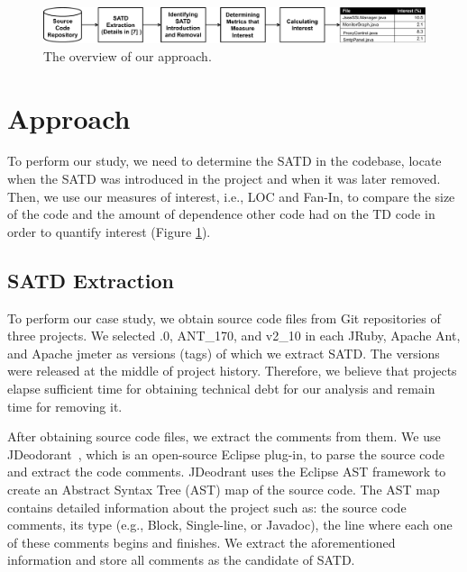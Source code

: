 
\begin{figure}[!t]
  \begin{center}
  \includegraphics[width=.95\textwidth]{figures/overview}
  \caption{The overview of our approach.}
  \label{fig:overview}
  \end{center}
\end{figure}


\section{Approach} \label{sec:approach}
To perform our study, we need to determine the SATD in the codebase, locate when the SATD was introduced in the project and when it was later removed. Then, we use our measures of interest, i.e., LOC and Fan-In, to compare the size of the code and the amount of dependence other code had on the TD code in order to quantify interest (Figure \ref{fig:overview}).

\subsection{SATD Extraction}
To perform our case study, we obtain source code files from Git repositories of three projects. We selected {.0}, {\sc ANT\_170}, and {\sc v2\_10} in each JRuby, Apache Ant, and Apache jmeter as versions (tags) of which we extract SATD. The versions were released at the middle of project history. Therefore, we believe that projects elapse sufficient time for obtaining technical debt for our analysis and remain time for removing it.

After obtaining source code files, we extract the comments from them. We use JDeodorant~\cite{Tsantalis2008CSMR}, which is an open-source Eclipse plug-in, to parse the source code and extract the code comments. JDeodrant uses the Eclipse AST framework to create an Abstract Syntax Tree (AST) map of the source code. The AST map contains detailed information about the project such as: the source code comments, its type (e.g., Block, Single-line, or Javadoc), the line where each one of these comments begins and finishes. We extract the aforementioned information and store all comments as the candidate of SATD.

